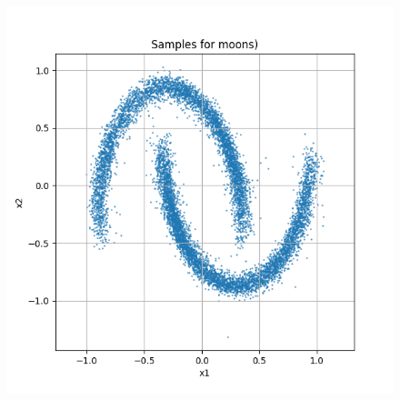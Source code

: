 \documentclass[a4paper,12pt]{article}
\begin{document}
\begin{figure}[H]
\begin{minipage}{0.3\textwidth}
  \end{minipage}
  \begin{minipage}{0.3\textwidth}
      \centering
      \includegraphics[width=\linewidth]{images/Samples for ddpm_2_200_0.0001_0.02_moons_sigmoid.png}
  \end{minipage}
\end{figure}
\end{document}
